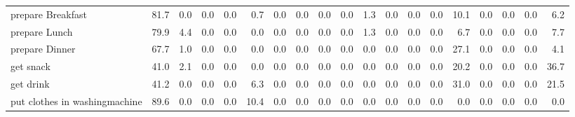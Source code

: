 \documentclass{article}
\begin{document}
\begin{sideways}
\begin{tabular}{lrrrrrrrrrrrrrrrrrr}
prepare Breakfast             &        81.7 &                0.0 &           0.0 &                          0.0 &                0.7 &                0.0 &                        0.0 &          0.0 &              0.0 &                1.3 &                    0.0 &                      0.0 &                  0.0 &                  10.1 &              0.0 &              0.0 &                                  0.0 &          6.2 \\
prepare Lunch                 &        79.9 &                4.4 &           0.0 &                          0.0 &                0.0 &                0.0 &                        0.0 &          0.0 &              0.0 &                1.3 &                    0.0 &                      0.0 &                  0.0 &                   6.7 &              0.0 &              0.0 &                                  0.0 &          7.7 \\
prepare Dinner                &        67.7 &                1.0 &           0.0 &                          0.0 &                0.0 &                0.0 &                        0.0 &          0.0 &              0.0 &                0.0 &                    0.0 &                      0.0 &                  0.0 &                  27.1 &              0.0 &              0.0 &                                  0.0 &          4.1 \\
get snack                     &        41.0 &                2.1 &           0.0 &                          0.0 &                0.0 &                0.0 &                        0.0 &          0.0 &              0.0 &                0.0 &                    0.0 &                      0.0 &                  0.0 &                  20.2 &              0.0 &              0.0 &                                  0.0 &         36.7 \\
get drink                     &        41.2 &                0.0 &           0.0 &                          0.0 &                6.3 &                0.0 &                        0.0 &          0.0 &              0.0 &                0.0 &                    0.0 &                      0.0 &                  0.0 &                  31.0 &              0.0 &              0.0 &                                  0.0 &         21.5 \\
put clothes in washingmachine &        89.6 &                0.0 &           0.0 &                          0.0 &               10.4 &                0.0 &                        0.0 &          0.0 &              0.0 &                0.0 &                    0.0 &                      0.0 &                  0.0 &                   0.0 &              0.0 &              0.0 &                                  0.0 &          0.0 \\

\end{tabular}
\end{sideways}
\end{document}
